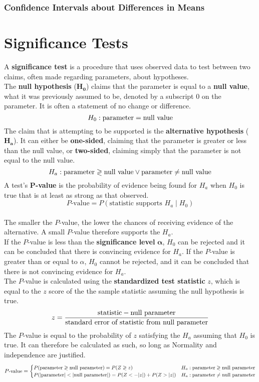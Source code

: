 \documentclass[../AP_Statistics.tex]{subfiles}
\begin{document}
			\subsection*{Confidence Intervals about Differences in Means}
	\chapter{Significance Tests}
		A \textbf{significance test} is a procedure that uses observed data to test between two claims, often made regarding parameters, about hypotheses. \\
		The \textbf{null hypothesis} ($\pmb{H_0}$) claims that the parameter is equal to a \textbf{null value}, what it was previously assumed to be, denoted by a subscript $0$ on the parameter. It is often a statement of no change or difference.
		\[H_0:\rm{parameter} = \text{null value}\]
		The claim that is attempting to be supported is the \textbf{alternative hypothesis} ($\pmb{H_a}$). It can either be \textbf{one-sided}, claiming that the parameter is greater or less than the null value, or \textbf{two-sided}, claiming simply that the parameter is not equal to the null value.
		\[H_a:\rm{parameter} \gtrless \text{null value} \lor \rm{parameter} \ne \text{null value}\]
		A test's $\pmb{P}$\textbf{-value} is the probability of evidence being found for $H_a$ when $H_0$ is true that is at least as strong as that observed.
		\[P\text{-value} = P(\text{statistic supports } H_a \mid H_0)\] \\
		The smaller the $P$-value, the lower the chances of receiving evidence of the alternative. A small $P$-value therefore supports the $H_a$. \\
		If the $P$-value is less than the \textbf{significance level} $\pmb{\alpha}$, $H_0$ can be rejected and it can be concluded that there is convincing evidence for $H_a$. If the $P$-value is greater than or equal to $\alpha$, $H_0$ cannot be rejected, and it can be concluded that there is not convincing evidence for $H_a$. \\
		The $P$-value is calculated using the \textbf{standardized test statistic} $z$, which is equal to the $z$ score of the the sample statistic assuming the null hypothesis is true.
		\[z = \frac{\text{statistic} - \text{null parameter}}{\text{standard error of statistic from null parameter}}\]
		The $P$-value is equal to the probability of $z$ satisfying the $H_a$ assuming that $H_0$ is true. It can therefore be calculated as such, so long as Normality and independence are justified.
		\[\small
			P\text{-value} = \begin{cases}
				P(\text{parameter} \gtrless \text{null parameter}) = P(Z \gtrless z) & H_a:\text{parameter} \gtrless \text{null parameter} \\
				P(|\text{parameter}| < |\text{null parameter}|) = P(Z < -|z|) + P(Z > |z|) & H_a:\text{parameter} \ne \text{null parameter}
			\end{cases}
		\]
\end{document}
